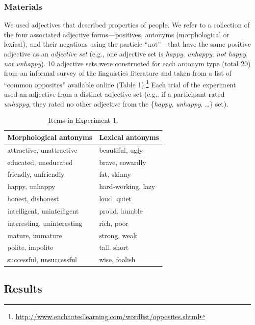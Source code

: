 \documentclass[floatsintext,doc]{apa6}
\let\rmarkdownfootnote\footnote%
\def\footnote{\protect\rmarkdownfootnote}
\begin{document}
\subsubsection{Materials}\label{materials}%

We used adjectives that described properties of people.
We refer to a collection of the four associated adjective forms---positives, antonyms (morphological or lexical), and their negations using the particle \enquote{not}---that have the same positive adjective as an \emph{adjective set} (e.g., one adjective set is \emph{happy}, \emph{unhappy}, \emph{not happy}, \emph{not unhappy}).
10 adjective sets were constructed for each antonym type (total 20) from an informal survey of the linguistics literature and taken from a list of \enquote{common opposites} available online (Table 1).\footnote{\url{http://www.enchantedlearning.com/wordlist/opposites.shtml}}
Each trial of the experiment used an adjective from a distinct adjective set (e.g., if a participant rated \emph{unhappy}, they rated no other adjective from the \{\emph{happy}, \emph{unhappy}, \ldots{}\} set).

\begin{table}[h]
\centering
\begingroup\fontsize{10pt}{11pt}\selectfont
\begin{tabular}{ll}
  \hline
Morphological antonyms & Lexical antonyms \\ 
  \hline
attractive, unattractive & beautiful, ugly \\ 
  educated, uneducated & brave, cowardly \\ 
  friendly, unfriendly & fat, skinny \\ 
  happy, unhappy & hard-working, lazy \\ 
  honest, dishonest & loud, quiet \\ 
  intelligent, unintelligent & proud, humble \\ 
  interesting, uninteresting & rich, poor \\ 
  mature, immature & strong, weak \\ 
  polite, impolite & tall, short \\ 
  successful, unsuccessful & wise, foolish \\ 
   \hline
\end{tabular}
\endgroup
\caption{Items in Experiment 1.} 
\end{table}

\subsection{Results}\label{results}%
\end{document}

